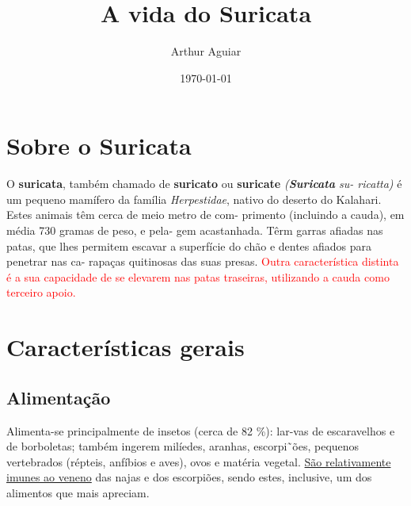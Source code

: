 \documentclass[a4paper,12pt]{article}
\title{A vida do Suricata}
\author{Arthur Aguiar}
\date {\today}
\begin{document}
\maketitle

\section{Sobre o Suricata}
O \textbf{suricata}, também chamado de  \textbf{suricato} ou  \textbf{suricate} \textit{(\textbf{Suricata} su-
ricatta)} é um pequeno mamífero da família \textit{Herpestidae}, nativo do
deserto do Kalahari. Estes animais têm cerca de meio metro de com-
primento (incluindo a cauda), em média 730 gramas de peso, e pela-
gem acastanhada. Têrm garras afiadas nas patas, que lhes permitem
escavar a superfície do chão e dentes afiados para penetrar nas ca-
rapaças quitinosas das suas presas. \textcolor{red}{Outra característica distinta é a sua capacidade de se elevarem nas patas traseiras, utilizando a cauda como terceiro apoio.}

\section{Características gerais}
\subsection{Alimentação}
Alimenta-se principalmente de insetos (cerca de 82 \%): lar-vas de escaravelhos e de borboletas; também ingerem milíedes, aranhas, escorpi˜ões, pequenos vertebrados (répteis, anfíbios e aves), ovos
e matéria vegetal. \uline{São relativamente imunes ao veneno} das najas
e dos escorpiões, sendo estes, inclusive, um dos alimentos que mais
apreciam.
\end{document}
